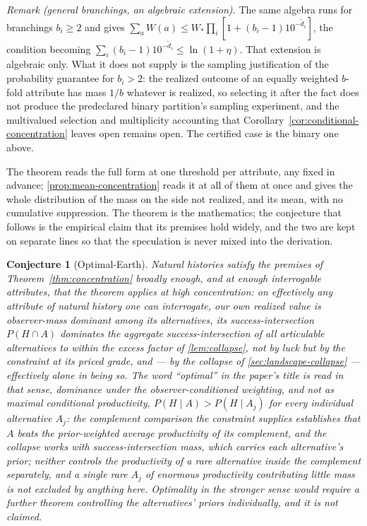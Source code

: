 \documentclass[11pt]{article}
\newtheorem{conjecture}{Conjecture}
\theoremstyle{definition}
\begin{document}
\noindent\textit{Remark (general branchings, an algebraic extension).} The same algebra runs for branchings $b_i \ge 2$ and gives $\sum_a W(a) \le W_\ast \prod_i [1 + (b_i - 1)10^{-\tilde d_i}]$, the condition becoming $\sum_i (b_i - 1)10^{-\tilde d_i} \le \ln(1+\eta)$. That extension is algebraic only. What it does not supply is the sampling justification of the probability guarantee for $b_i > 2$: the realized outcome of an equally weighted $b$-fold attribute has mass $1/b$ whatever is realized, so selecting it after the fact does not produce the predeclared binary partition's sampling experiment, and the multivalued selection and multiplicity accounting that Corollary~\ref{cor:conditional-concentration} leaves open remains open. The certified case is the binary one above.

\noindent The theorem reads the full form at one threshold per attribute, any fixed in advance; \autoref{prop:mean-concentration} reads it at all of them at once and gives the whole distribution of the mass on the side not realized, and its mean, with no cumulative suppression. The theorem is the mathematics; the conjecture that follows is the empirical claim that its premises hold widely, and the two are kept on separate lines so that the speculation is never mixed into the derivation.

\begin{conjecture}[Optimal-Earth]
\label{conj:oec}
Natural histories satisfy the premises of Theorem~\ref{thm:concentration} broadly enough, and at enough interrogable attributes, that the theorem applies at high concentration: on effectively any attribute of natural history one can interrogate, our own realized value is \emph{observer-mass dominant} among its alternatives, its success-intersection $P(H \cap A)$ dominates the aggregate success-intersection of all articulable alternatives to within the excess factor of \autoref{lem:collapse}, not by luck but by the constraint at its priced grade, and --- by the collapse of \autoref{sec:landscape-collapse} --- effectively alone in being so. The word ``optimal'' in the paper's title is read in that sense, dominance under the observer-conditioned weighting, and not as \emph{maximal conditional productivity}, $P(H \mid A) > P(H \mid A_j)$ for every individual alternative $A_j$: the complement comparison the constraint supplies establishes that $A$ beats the prior-weighted average productivity of its complement, and the collapse works with success-intersection mass, which carries each alternative's prior; neither controls the productivity of a rare alternative inside the complement separately, and a single rare $A_j$ of enormous productivity contributing little mass is not excluded by anything here. Optimality in the stronger sense would require a further theorem controlling the alternatives' priors individually, and it is not claimed.
\end{conjecture}
\end{document}
